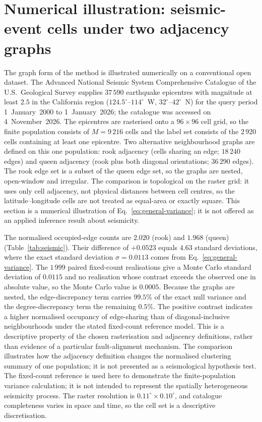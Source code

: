 \documentclass[final,1p,times,authoryear]{elsarticle}
\theoremstyle{definition}
\begin{document}
\section{Numerical illustration: seismic-event cells under two adjacency graphs}

The graph form of the method is illustrated numerically on a conventional
open dataset. The
Advanced National Seismic System Comprehensive Catalogue of the
U.S.~Geological Survey \citep{USGS-ANSS-COMCAT} supplies $37\,590$ earthquake
epicentres with magnitude at least $2.5$ in the California region
($124.5^\circ$--$114^\circ$~W, $32^\circ$--$42^\circ$~N) for the query period
1~January~2000 to 1~January~2026; the catalogue was accessed on
4~November~2026. The
epicentres are rasterised onto a $96\times96$ cell grid, so the finite
population consists of $M=9\,216$ cells and the label set consists of the
$2\,920$ cells containing at least one epicentre. Two alternative
neighbourhood graphs are defined on this one population: rook adjacency
(cells sharing an edge; $18\,240$ edges) and queen adjacency (rook plus both
diagonal orientations; $36\,290$ edges). The rook edge set is a subset of the
queen edge set, so the graphs are nested, open-window and irregular. The
comparison is topological on the raster grid: it uses only cell adjacency,
not physical distances between cell centres, so the latitude--longitude cells
are not treated as equal-area or exactly square. This section is a numerical
illustration of Eq.~\eqref{eq:general-variance}; it is not offered as an
applied inference result about seismicity.

The normalised occupied-edge counts are $2.020$ (rook) and $1.968$ (queen)
(Table~\ref{tab:seismic}). Their difference of $+0.0523$ equals $4.63$
standard deviations, where the exact standard deviation $\sigma=0.0113$ comes
from Eq.~\eqref{eq:general-variance}. The $1\,999$ paired fixed-count
realisations give a Monte Carlo standard deviation of $0.0115$ and no
realisation whose contrast exceeds the observed one in absolute value, so the
Monte Carlo value is $0.0005$. Because the graphs are nested, the
edge-discrepancy term carries $99.5\%$ of the exact null variance and the
degree-discrepancy term the remaining $0.5\%$. The positive contrast
indicates a higher normalised occupancy of edge-sharing than of
diagonal-inclusive neighbourhoods under the stated fixed-count reference
model. This is a descriptive property of the chosen rasterisation and
adjacency definitions, rather than evidence of a particular fault-alignment
mechanism. The comparison illustrates how
the adjacency definition changes the normalised clustering summary of one
population; it is not presented as a seismological hypothesis test. The
fixed-count reference is used here to demonstrate the finite-population
variance calculation; it is not intended to represent the spatially
heterogeneous seismicity process. The raster
resolution is $0.11^\circ\times0.10^\circ$, and catalogue completeness varies
in space and time, so the cell set is a descriptive discretisation.
\end{document}
